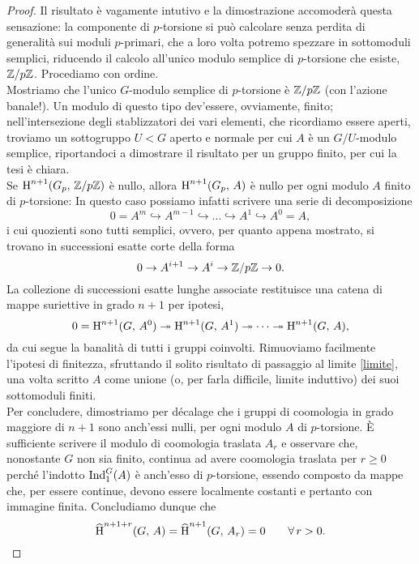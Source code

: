 \begin{proof}
	Il risultato è vagamente intutivo e la dimostrazione accomoderà questa sensazione: la componente di $ p $-torsione si può calcolare senza perdita di generalità sui moduli $ p $-primari, che a loro volta potremo spezzare in sottomoduli semplici, riducendo il calcolo all'unico modulo semplice di $ p $-torsione che esiste, $ \mathbb{Z}/p\mathbb{Z} $. Procediamo con ordine. \\
	
	Mostriamo che l'unico $ G $-modulo semplice di $ p $-torsione è $ \mathbb{Z}/p\mathbb{Z} $ (con l'azione banale!). Un modulo di questo tipo dev'essere, ovviamente, finito; nell'intersezione degli stablizzatori dei vari elementi, che ricordiamo essere aperti, troviamo un sottogruppo $ U < G $ aperto e normale per cui $ A $ è un $ G/U $-modulo semplice, riportandoci a dimostrare il risultato per un gruppo finito, per cui la tesi è chiara. \\
	
	Se $ \operatorname{H}^{n+1}(G_p, \, \mathbb{Z}/p\mathbb{Z}) $ è nullo, allora $ \operatorname{H}^{n+1}(G_p, \, A) $ è nullo per ogni modulo $ A $ finito di $ p $-torsione: In questo caso possiamo infatti scrivere una serie di decomposizione
	\[ 0 = A^m \hookrightarrow A^{m-1} \hookrightarrow \dots \hookrightarrow A^1 \hookrightarrow A^0 = A, \]
	i cui quozienti sono tutti semplici, ovvero, per quanto appena mostrato, si trovano in successioni esatte corte della forma
	\[ 0 \to A^{i+1} \to A^i \to \mathbb{Z}/p\mathbb{Z} \to 0. \]
	La collezione di successioni esatte lunghe associate restituisce una catena di mappe suriettive in grado $ n+1 $ per ipotesi,
	\[ 0 = \operatorname{H}^{n+1}(G, \, A^0) \twoheadrightarrow \operatorname{H}^{n+1}(G, \, A^1) \twoheadrightarrow \dots \twoheadrightarrow \operatorname{H}^{n+1}(G, \, A), \]
	da cui segue la banalità di tutti i gruppi coinvolti. Rimuoviamo facilmente l'ipotesi di finitezza, sfruttando il solito risultato di passaggio al limite \ref{limite}, una volta scritto $ A $ come unione (o, per farla difficile, limite induttivo) dei suoi sottomoduli finiti. \\
	
	Per concludere, dimostriamo per décalage che i gruppi di coomologia in grado maggiore di $ n+1 $ sono anch'essi nulli, per ogni modulo $ A $ di $ p $-torsione. È sufficiente scrivere il modulo di coomologia traslata $ A_{r} $ e osservare che, nonostante $ G $ non sia finito, continua ad avere coomologia traslata per $ r \geq 0 $ perché l'indotto $ \operatorname{Ind}_1^G(A) $ è anch'esso di $ p $-torsione, essendo composto da mappe che, per essere continue, devono essere localmente costanti e pertanto con immagine finita. Concludiamo dunque che	
	\begin{equation*}
	 \operatorname{\widehat{H}}^{n+1+r}(G, \, A) = \operatorname{\widehat{H}}^{n+1}(G, \, A_r) = 0 \qquad \forall\, r > 0.
	\end{equation*}
\end{proof}

